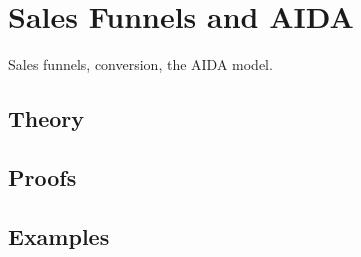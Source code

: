 
\section{Sales Funnels and AIDA}
\label{sec:2.6.04-sales-funnels-aida}

\begin{ticket}
Sales funnels, conversion, the AIDA model.
\end{ticket}

\subsection*{Theory}

\subsection*{Proofs}

\subsection*{Examples}
